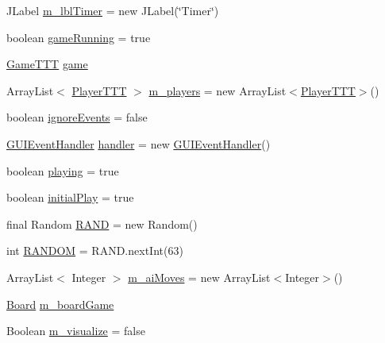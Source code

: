 \begin{DoxyCompactItemize}
\item 
J\+Label \hyperlink{class_display_1_1_display_t_t_t_a42c7a03ac93841369bd7e73460b59e11}{m\+\_\+lbl\+Timer} = new J\+Label(\char`\"{}Timer\char`\"{})
\item 
boolean \hyperlink{class_display_1_1_display_t_t_t_a8d67b95462ceda8ce22f992628f91ca4}{game\+Running} = true
\item 
\hyperlink{class_game_1_1_game_t_t_t}{Game\+T\+T\+T} \hyperlink{class_display_1_1_display_t_t_t_a2e4a57cf17355b6a63f5b9d4e9e74de4}{game}
\item 
Array\+List$<$ \hyperlink{class_player_1_1_player_t_t_t}{Player\+T\+T\+T} $>$ \hyperlink{class_display_1_1_display_t_t_t_ad3a0687ab98eb4f191cd30a64ef60304}{m\+\_\+players} = new Array\+List$<$\hyperlink{class_player_1_1_player_t_t_t}{Player\+T\+T\+T}$>$()
\item 
boolean \hyperlink{class_display_1_1_display_t_t_t_a713fdaab41d88af675c9f54dfcdb87a2}{ignore\+Events} = false
\item 
\hyperlink{class_display_1_1_display_t_t_t_1_1_g_u_i_event_handler}{G\+U\+I\+Event\+Handler} \hyperlink{class_display_1_1_display_t_t_t_a834294acca3e75ec3d75e52ecd6028bc}{handler} = new \hyperlink{class_display_1_1_display_t_t_t_1_1_g_u_i_event_handler}{G\+U\+I\+Event\+Handler}()
\item 
boolean \hyperlink{class_display_1_1_display_t_t_t_abea0091c8be45438d7be31081d6b8bc3}{playing} = true
\item 
boolean \hyperlink{class_display_1_1_display_t_t_t_a7a6b9526f0a795edccb3911009d74842}{initial\+Play} = true
\item 
final Random \hyperlink{class_display_1_1_display_t_t_t_a532c82249100ab477c093e5202b42415}{R\+A\+N\+D} = new Random()
\item 
int \hyperlink{class_display_1_1_display_t_t_t_a30415017d1d80126ca6295a1d711684d}{R\+A\+N\+D\+O\+M} = R\+A\+N\+D.\+next\+Int(63)
\item 
Array\+List$<$ Integer $>$ \hyperlink{class_display_1_1_display_t_t_t_aaa3a8705876d9e60253f6c4599966ae9}{m\+\_\+ai\+Moves} = new Array\+List$<$Integer$>$()
\item 
\hyperlink{class_board_1_1_board}{Board} \hyperlink{class_display_1_1_display_t_t_t_a3f540c3d30082e201fcb37c9623d6d27}{m\+\_\+board\+Game}
\item 
Boolean \hyperlink{class_display_1_1_display_t_t_t_a92b6a913aec2926f4fdf565a4146bb31}{m\+\_\+visualize} = false
\end{DoxyCompactItemize}


